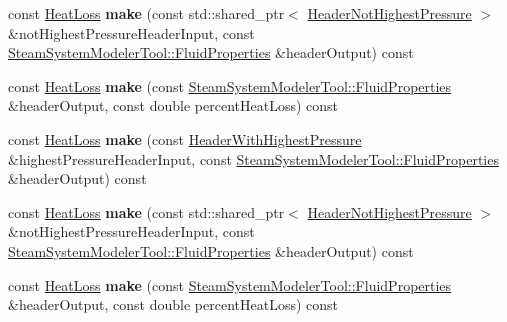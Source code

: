 \begin{DoxyCompactItemize}
\item 
\mbox{\label{class_heat_loss_factory_a8e518177317bf65d0658d171fdeb8d65}} 
const \hyperlink{class_heat_loss}{Heat\+Loss} {\bfseries make} (const std\+::shared\+\_\+ptr$<$ \hyperlink{class_header_not_highest_pressure}{Header\+Not\+Highest\+Pressure} $>$ \&not\+Highest\+Pressure\+Header\+Input, const \hyperlink{struct_steam_system_modeler_tool_1_1_fluid_properties}{Steam\+System\+Modeler\+Tool\+::\+Fluid\+Properties} \&header\+Output) const
\item 
\mbox{\label{class_heat_loss_factory_a64e610fc112e14ab36a245d5ee365d84}} 
const \hyperlink{class_heat_loss}{Heat\+Loss} {\bfseries make} (const \hyperlink{struct_steam_system_modeler_tool_1_1_fluid_properties}{Steam\+System\+Modeler\+Tool\+::\+Fluid\+Properties} \&header\+Output, const double percent\+Heat\+Loss) const
\item 
\mbox{\label{class_heat_loss_factory_aada0db1774fa97be20045472abd120a4}} 
const \hyperlink{class_heat_loss}{Heat\+Loss} {\bfseries make} (const \hyperlink{class_header_with_highest_pressure}{Header\+With\+Highest\+Pressure} \&highest\+Pressure\+Header\+Input, const \hyperlink{struct_steam_system_modeler_tool_1_1_fluid_properties}{Steam\+System\+Modeler\+Tool\+::\+Fluid\+Properties} \&header\+Output) const
\item 
\mbox{\label{class_heat_loss_factory_a8e518177317bf65d0658d171fdeb8d65}} 
const \hyperlink{class_heat_loss}{Heat\+Loss} {\bfseries make} (const std\+::shared\+\_\+ptr$<$ \hyperlink{class_header_not_highest_pressure}{Header\+Not\+Highest\+Pressure} $>$ \&not\+Highest\+Pressure\+Header\+Input, const \hyperlink{struct_steam_system_modeler_tool_1_1_fluid_properties}{Steam\+System\+Modeler\+Tool\+::\+Fluid\+Properties} \&header\+Output) const
\item 
\mbox{\label{class_heat_loss_factory_a64e610fc112e14ab36a245d5ee365d84}} 
const \hyperlink{class_heat_loss}{Heat\+Loss} {\bfseries make} (const \hyperlink{struct_steam_system_modeler_tool_1_1_fluid_properties}{Steam\+System\+Modeler\+Tool\+::\+Fluid\+Properties} \&header\+Output, const double percent\+Heat\+Loss) const
\end{DoxyCompactItemize}


